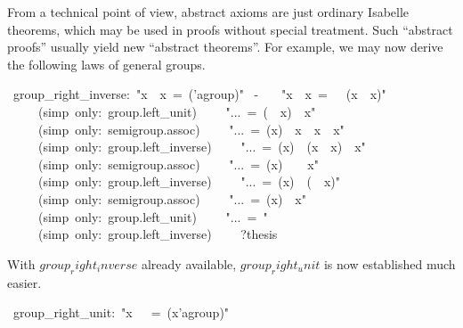 \begin{isabelle}
\begin{isamarkuptext}
 \medskip From a technical point of view, abstract axioms are just
 ordinary Isabelle theorems, which may be used in proofs without
 special treatment.  Such ``abstract proofs'' usually yield new
 ``abstract theorems''.  For example, we may now derive the following
 laws of general groups.%
\end{isamarkuptext}%
~group\_right\_inverse:~{"}x~{\isasymOtimes}~x{\isasyminv}~=~({\isasymunit}{\isasymColon}'a{\isasymColon}group){"}\isanewline
{}~-\isanewline
~~~{"}x~{\isasymOtimes}~x{\isasyminv}~=~{\isasymunit}~{\isasymOtimes}~(x~{\isasymOtimes}~x{\isasyminv}){"}\isanewline
~~~~~(simp~only:~group.left\_unit)\isanewline
~~~~{"}...~=~({\isasymunit}~{\isasymOtimes}~x)~{\isasymOtimes}~x{\isasyminv}{"}\isanewline
~~~~~(simp~only:~semigroup.assoc)\isanewline
~~~~{"}...~=~(x{\isasyminv}){\isasyminv}~{\isasymOtimes}~x{\isasyminv}~{\isasymOtimes}~x~{\isasymOtimes}~x{\isasyminv}{"}\isanewline
~~~~~(simp~only:~group.left\_inverse)\isanewline
~~~~{"}...~=~(x{\isasyminv}){\isasyminv}~{\isasymOtimes}~(x{\isasyminv}~{\isasymOtimes}~x)~{\isasymOtimes}~x{\isasyminv}{"}\isanewline
~~~~~(simp~only:~semigroup.assoc)\isanewline
~~~~{"}...~=~(x{\isasyminv}){\isasyminv}~{\isasymOtimes}~{\isasymunit}~{\isasymOtimes}~x{\isasyminv}{"}\isanewline
~~~~~(simp~only:~group.left\_inverse)\isanewline
~~~~{"}...~=~(x{\isasyminv}){\isasyminv}~{\isasymOtimes}~({\isasymunit}~{\isasymOtimes}~x{\isasyminv}){"}\isanewline
~~~~~(simp~only:~semigroup.assoc)\isanewline
~~~~{"}...~=~(x{\isasyminv}){\isasyminv}~{\isasymOtimes}~x{\isasyminv}{"}\isanewline
~~~~~(simp~only:~group.left\_unit)\isanewline
~~~~{"}...~=~{\isasymunit}{"}\isanewline
~~~~~(simp~only:~group.left\_inverse)\isanewline
~~~~?thesis~\isanewline
{}%
\begin{isamarkuptext}%
\noindent With $group_right_inverse$ already available,
 $group_right_unit$\label{thm:group-right-unit} is now established
 much easier.%
\end{isamarkuptext}%
~group\_right\_unit:~{"}x~{\isasymOtimes}~{\isasymunit}~=~(x{\isasymColon}'a{\isasymColon}group){"}\isanewline

\end{isabelle}
